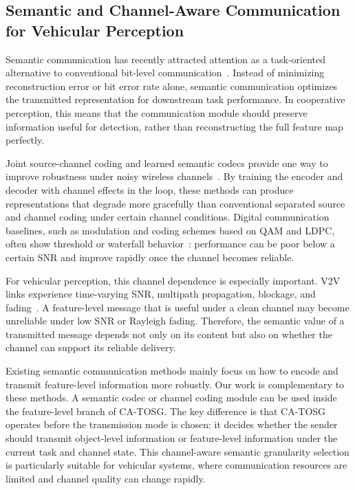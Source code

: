 \documentclass[journal]{IEEEtran}
\newcommand{\method}{CA-TOSG}
\begin{document}
\subsection{Semantic and Channel-Aware Communication for Vehicular Perception}

Semantic communication has recently attracted attention as a task-oriented alternative to conventional bit-level communication~\cite{sheng2024importance,gan2026scomcp,bourtsoulatze2019deepjscc,xie2021deepsc,gunduz2023beyond}. Instead of minimizing reconstruction error or bit error rate alone, semantic communication optimizes the transmitted representation for downstream task performance. In cooperative perception, this means that the communication module should preserve information useful for detection, rather than reconstructing the full feature map perfectly.

Joint source-channel coding and learned semantic codecs provide one way to improve robustness under noisy wireless channels~\cite{sheng2024importance,gan2026scomcp}. By training the encoder and decoder with channel effects in the loop, these methods can produce representations that degrade more gracefully than conventional separated source and channel coding under certain channel conditions. Digital communication baselines, such as modulation and coding schemes based on QAM and LDPC, often show threshold or waterfall behavior~\cite{ieee80211bd}: performance can be poor below a certain SNR and improve rapidly once the channel becomes reliable.

For vehicular perception, this channel dependence is especially important. V2V links experience time-varying SNR, multipath propagation, blockage, and fading~\cite{ieee80211bd}. A feature-level message that is useful under a clean channel may become unreliable under low SNR or Rayleigh fading. Therefore, the semantic value of a transmitted message depends not only on its content but also on whether the channel can support its reliable delivery.

Existing semantic communication methods mainly focus on how to encode and transmit feature-level information more robustly. Our work is complementary to these methods. A semantic codec or channel coding module can be used inside the feature-level branch of \method{}. The key difference is that \method{} operates before the transmission mode is chosen: it decides whether the sender should transmit object-level information or feature-level information under the current task and channel state. This channel-aware semantic granularity selection is particularly suitable for vehicular systems, where communication resources are limited and channel quality can change rapidly.
\end{document}
